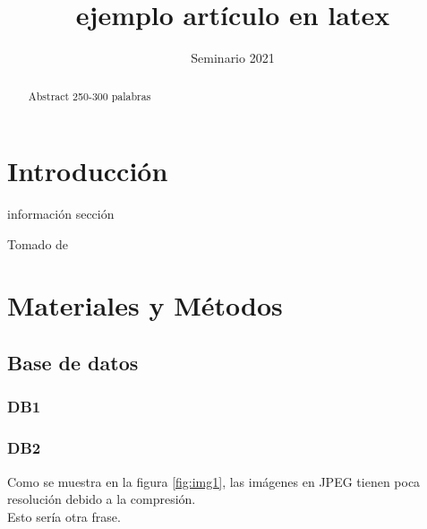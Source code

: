 \documentclass[]{article}
\title{ejemplo artículo en latex}
\author{Seminario 2021}
\begin{document}
\maketitle

\begin{abstract}
Abstract 250-300 palabras
\end{abstract}

\section{Introducción}
información sección

Tomado de \cite{Rasmunssen05}

\section{Materiales y Métodos}

\subsection{Base de datos}

\subsubsection{DB1}

\subsubsection{DB2}

Como se muestra en la figura \ref{fig:img1}, las imágenes en JPEG tienen poca resolución debido a la compresión.\\

Esto sería otra frase.
\end{document}
